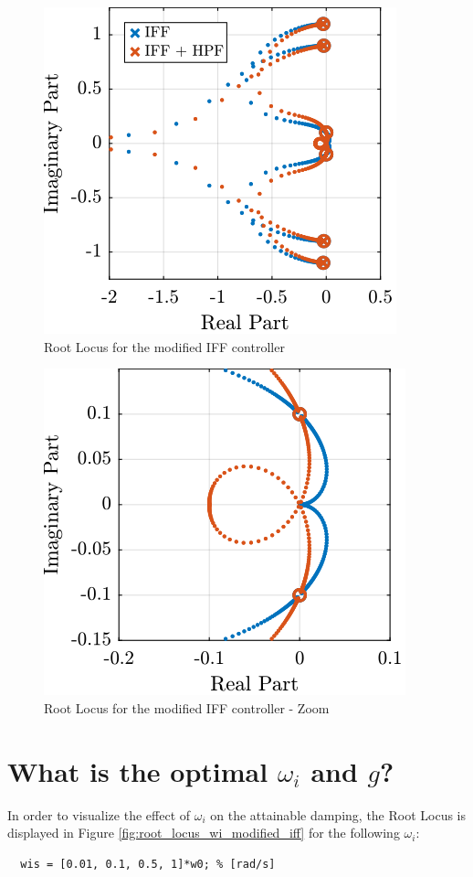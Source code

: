 \documentclass[a4paper, 10pt, DIV=12, parskip=full]{scrreprt}
\begin{document}
\begin{figure}[htbp]
\centering
\includegraphics[scale=1]{figs/root_locus_modified_iff.png}
\caption{\label{fig:root_locus_modified_iff}Root Locus for the modified IFF controller}
\end{figure}

\begin{figure}[htbp]
\centering
\includegraphics[scale=1]{figs/root_locus_modified_iff_zoom.png}
\caption{\label{fig:root_locus_modified_iff_zoom}Root Locus for the modified IFF controller - Zoom}
\end{figure}

\section{What is the optimal \(\omega_i\) and \(g\)?}
\label{sec:org028e747}
In order to visualize the effect of \(\omega_i\) on the attainable damping, the Root Locus is displayed in Figure \ref{fig:root_locus_wi_modified_iff} for the following \(\omega_i\):
\begin{verbatim}
  wis = [0.01, 0.1, 0.5, 1]*w0; % [rad/s]
\end{verbatim}
\end{document}
